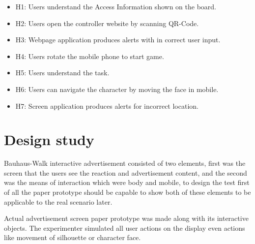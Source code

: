 \begin{itemize}
\item H1: Users understand the Access Information shown on the board.
\item H2: Users open the controller website by scanning QR-Code.
\item H3: Webpage application produces alerts with in correct user input.
\item H4: Users rotate the mobile phone to start game.
\item H5: Users understand the task.
\item H6: Users can navigate the character by moving the face in mobile.
\item H7: Screen application produces alerts for incorrect location.
\end{itemize}

\section{Design study}
Bauhaus-Walk interactive advertisement consisted of two elements, first was the screen that the users see the reaction and advertisement content, and the second was the means of interaction which were body and mobile, to design the test first of all the paper prototype should be capable to show both of these elements to be applicable to the real scenario later.

Actual advertisement screen paper prototype was made along with its interactive objects. The experimenter simulated all user actions on the display even actions like movement of silhouette or character face.



